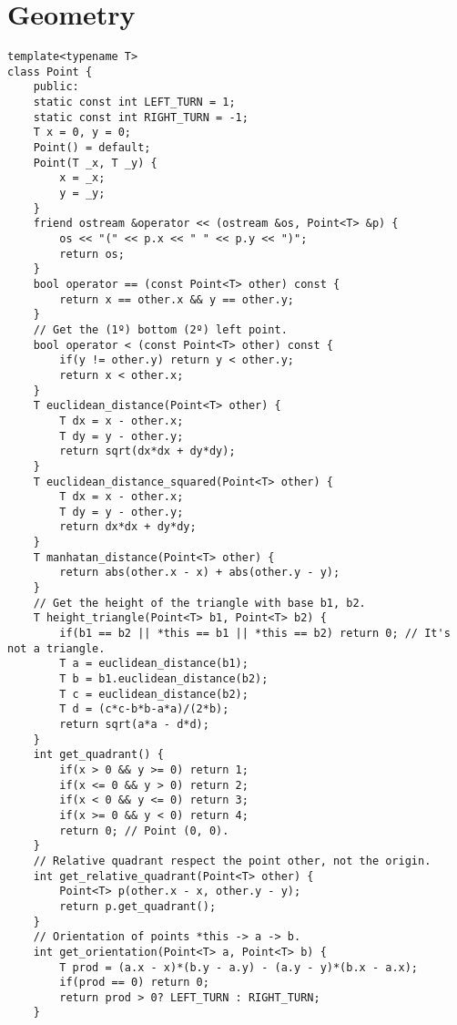 \documentclass[a4paper,10pt]{article}
\begin{document}
\section*{Geometry}
\begin{multicols}{2}

\begin{verbatim}
template<typename T>
class Point {
    public:
    static const int LEFT_TURN = 1;
    static const int RIGHT_TURN = -1;
    T x = 0, y = 0;
    Point() = default;
    Point(T _x, T _y) {
        x = _x;
        y = _y;
    }
    friend ostream &operator << (ostream &os, Point<T> &p) {
        os << "(" << p.x << " " << p.y << ")";
        return os;
    }
    bool operator == (const Point<T> other) const {
        return x == other.x && y == other.y;
    }
    // Get the (1º) bottom (2º) left point.
    bool operator < (const Point<T> other) const {
        if(y != other.y) return y < other.y;
        return x < other.x;
    }
    T euclidean_distance(Point<T> other) {
        T dx = x - other.x;
        T dy = y - other.y;
        return sqrt(dx*dx + dy*dy);
    }
    T euclidean_distance_squared(Point<T> other) {
        T dx = x - other.x;
        T dy = y - other.y;
        return dx*dx + dy*dy;
    }
    T manhatan_distance(Point<T> other) {
        return abs(other.x - x) + abs(other.y - y);
    }
    // Get the height of the triangle with base b1, b2.
    T height_triangle(Point<T> b1, Point<T> b2) {
        if(b1 == b2 || *this == b1 || *this == b2) return 0; // It's not a triangle.
        T a = euclidean_distance(b1);
        T b = b1.euclidean_distance(b2);
        T c = euclidean_distance(b2);
        T d = (c*c-b*b-a*a)/(2*b);
        return sqrt(a*a - d*d);
    }
    int get_quadrant() {
        if(x > 0 && y >= 0) return 1;
        if(x <= 0 && y > 0) return 2;
        if(x < 0 && y <= 0) return 3;
        if(x >= 0 && y < 0) return 4;
        return 0; // Point (0, 0).
    }
    // Relative quadrant respect the point other, not the origin.
    int get_relative_quadrant(Point<T> other) {
        Point<T> p(other.x - x, other.y - y);
        return p.get_quadrant();
    }
    // Orientation of points *this -> a -> b.
    int get_orientation(Point<T> a, Point<T> b) {
        T prod = (a.x - x)*(b.y - a.y) - (a.y - y)*(b.x - a.x);
        if(prod == 0) return 0;
        return prod > 0? LEFT_TURN : RIGHT_TURN;
    }
    \end{verbatim}
\end{multicols}
\end{document}
